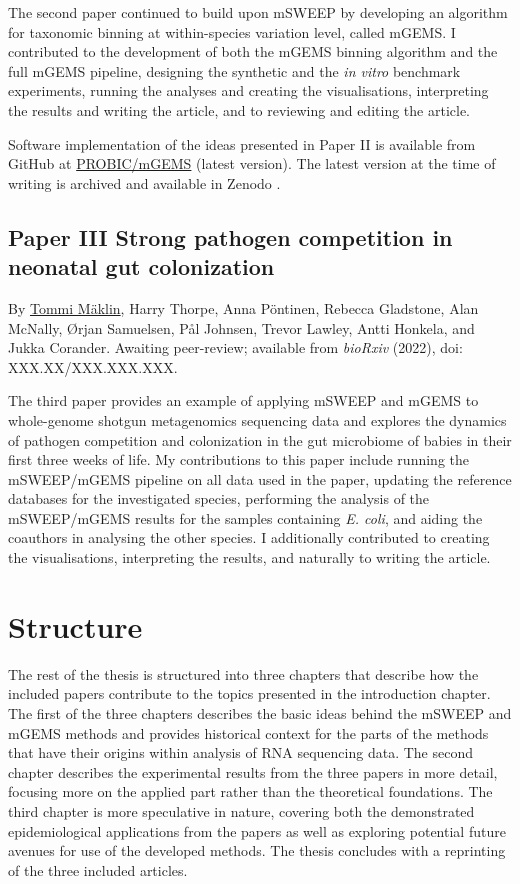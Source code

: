 \documentclass[officiallayout]{tktla}
\begin{document}
The second paper continued to build upon mSWEEP by developing an
algorithm for taxonomic binning at within-species variation level,
called mGEMS. I contributed to the development of both the mGEMS
binning algorithm and the full mGEMS pipeline, designing the synthetic
and the \textit{in vitro} benchmark experiments, running the analyses
and creating the visualisations, interpreting the results and writing
the article, and to reviewing and editing the article.

Software implementation of the ideas presented in Paper II is
available from GitHub at
\href{https://github.com/PROBIC/mGEMS}{PROBIC/mGEMS} (latest version).
The latest version at the time of writing is archived and available in
Zenodo \citep{maklin_mSWEEP}.

\subsection*{Paper III \textemdash Strong pathogen competition in neonatal gut colonization}
By \underline{Tommi Mäklin}, Harry Thorpe, Anna Pöntinen, Rebecca
Gladstone, Alan McNally, Ørjan Samuelsen, Pål Johnsen, Trevor Lawley,
Antti Honkela, and Jukka Corander. Awaiting peer-review; available
from \textit{bioRxiv} (2022), doi: XXX.XX/XXX.XXX.XXX.

The third paper provides an example of applying mSWEEP and mGEMS to
whole-genome shotgun metagenomics sequencing data and explores the
dynamics of pathogen competition and colonization in the gut
microbiome of babies in their first three weeks of life. My
contributions to this paper include running the mSWEEP/mGEMS pipeline
on all data used in the paper, updating the reference databases for
the investigated species, performing the analysis of the mSWEEP/mGEMS
results for the samples containing \textit{E. coli}, and aiding the
coauthors in analysing the other species. I additionally contributed
to creating the visualisations, interpreting the results, and
naturally to writing the article.

\section{Structure}

The rest of the thesis is structured into three chapters that describe
how the included papers contribute to the topics presented in the
introduction chapter. The first of the three chapters describes the
basic ideas behind the mSWEEP and mGEMS methods and provides
historical context for the parts of the methods that have their
origins within analysis of RNA sequencing data. The second chapter
describes the experimental results from the three papers in more
detail, focusing more on the applied part rather than the theoretical
foundations. The third chapter is more speculative in nature, covering
both the demonstrated epidemiological applications from the papers as
well as exploring potential future avenues for use of the developed
methods. The thesis concludes with a reprinting of the three included
articles.
\end{document}
